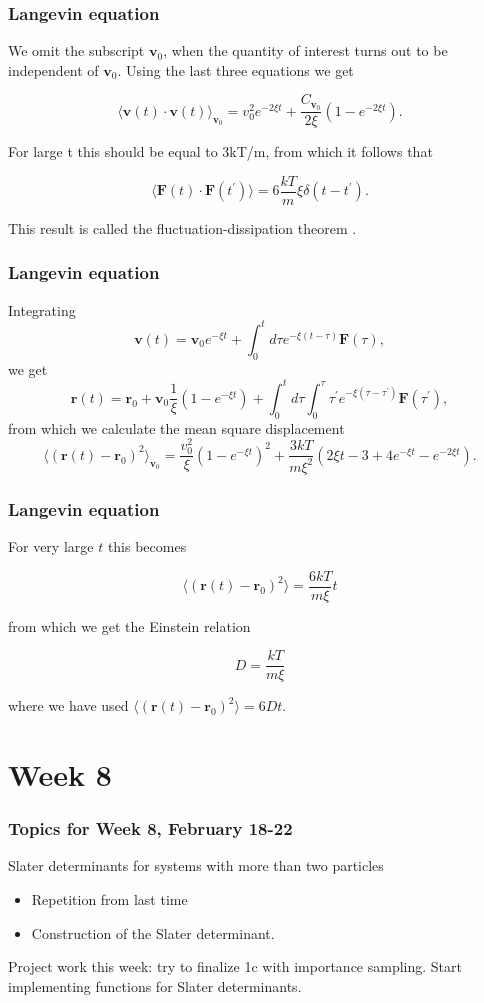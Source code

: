\documentclass[compress]{beamer}
\renewcommand{\vec}[1]{\boldsymbol{#1}}
\begin{document}
\frame
{
  \frametitle{Langevin equation}
\begin{small}
{\scriptsize
We omit the subscript $\vec{v}_{0}$, when the quantity of interest turns out to be independent of $\vec{v}_{0}$. Using the last three equations we get

 \[
\langle \vec{v}(t)\cdot \vec{v}(t)\rangle_{\vec{v}_{0}}=v_{0}^{2}e^{-2\xi t}+\frac{C_{\vec{v}_{0}}}{2\xi }(1-e^{-2\xi t}).\]

For large t this should be equal to 3kT/m, from which it follows that

\[
\langle \vec{F}(t)\cdot \vec{F}(t^{\prime })\rangle =6\frac{kT}{m}\xi \delta (t-t^{\prime }). \]

This result is called the fluctuation-dissipation theorem .
}
\end{small}
}
\frame
{
  \frametitle{Langevin equation}
\begin{small}
{\scriptsize
Integrating 
 \[ 
\vec{v}(t)=\vec{v}_{0}e^{-\xi t}+\int_{0}^{t}d\tau e^{-\xi (t-\tau )}\vec{F }(\tau ), \] 
we get
\[
\vec{r}(t)=\vec{r}_{0}+\vec{v}_{0}\frac{1}{\xi }(1-e^{-\xi t})+
\int_0^td\tau \int_0^{\tau}\tau ^{\prime } e^{-\xi (\tau -\tau ^{\prime })}\vec{F}(\tau ^{\prime }), \]
from which we calculate the mean square displacement 
\[
\langle ( \vec{r}(t)-\vec{r}_{0})^{2}\rangle _{\vec{v}_{0}}=\frac{v_0^2}{\xi}(1-e^{-\xi t})^{2}+\frac{3kT}{m\xi ^{2}}(2\xi t-3+4e^{-\xi t}-e^{-2\xi t}). \]
}
\end{small}
}
\frame
{
  \frametitle{Langevin equation}
\begin{small}
{\scriptsize
For very large $t$ this becomes

\[
\langle (\vec{r}(t)-\vec{r}_{0})^{2}\rangle =\frac{6kT}{m\xi }t \] 

from which we get the Einstein relation  

 \[ D= \frac{kT}{m\xi } \] 	

where we have used $\langle (\vec{r}(t)-\vec{r}_{0})^{2}\rangle =6Dt$.
}
\end{small}
}


\section[Week 8]{Week 8}
\frame
{
  \frametitle{Topics for Week 8, February 18-22}
  \begin{block}{Slater determinants for systems with more than two particles}
\begin{itemize}
\item Repetition from last time
\item Construction of the Slater determinant.
\end{itemize}
Project work this week: try to finalize 1c with importance sampling.  Start implementing functions for Slater determinants.
  \end{block}
} 
\end{document}
